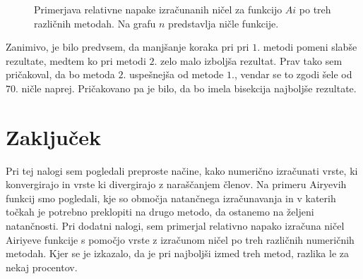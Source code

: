\documentclass[11pt]{article}
\begin{document}
\begin{figure}[t!]	 %
\begin{center}

\end{center}
\caption{Primerjava relativne napake izračunanih ničel za funkcijo $Ai$ po treh različnih metodah. Na grafu $n$ predstavlja ničle funkcije.  }

\end{figure}
Zanimivo, je bilo predvsem, da manjšanje koraka pri pri $1.$ metodi pomeni slabše rezultate, medtem ko pri metodi $2.$ zelo malo izboljša rezultat. Prav tako sem pričakoval, da bo metoda $2.$ uspešnejša od metode $1.$, vendar se to zgodi šele od $70.$ ničle naprej. Pričakovano pa je bilo, da bo imela bisekcija najboljše rezultate.
\newpage
\section{Zaključek}
Pri tej nalogi sem pogledali preproste načine, kako numerično izračunati vrste, ki konvergirajo in vrste ki divergirajo z naraščanjem členov. Na primeru Airyevih funkcij smo pogledali, kje so območja natančnega izračunavanja in v katerih točkah je potrebno preklopiti na drugo metodo, da ostanemo na željeni natančnosti. Pri dodatni nalogi, sem primerjal relativno napako izračuna ničel Airiyeve funkcije s pomočjo vrste z izračunom ničel po treh različnih numeričnih metodah. Kjer se je izkazalo, da je pri najboljši izmed treh metod, razlika le za nekaj procentov. 
\end{document}
